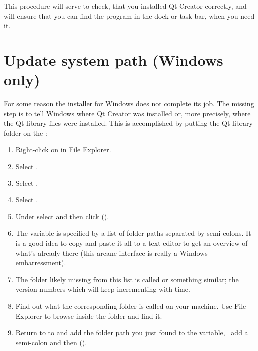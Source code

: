 This procedure will serve to check, that you installed Qt Creator correctly, and will ensure that you can find the program in the dock or task bar, when you need it.

\section{Update system path (Windows only)}
For some reason the installer for Windows does not complete its job. The missing step is to tell Windows where Qt Creator was installed or, more precisely, where the Qt library files were installed. This is accomplished by putting the Qt library folder on the :

\begin{enumerate}
\item Right-click on  in File Explorer.
\item Select .
\item Select .
\item Select .
\item Under  select  and then click  ().
\item The  variable is specified by a list of folder paths separated by semi-colons. It is a good idea to copy and paste it all to a text editor to get an overview of what's already there (this arcane interface is really a Windows embarressment).
\item The folder likely missing from this list is called  or something similar; the version numbers which will keep incrementing with time. 
\item Find out what the corresponding folder is called on your machine. Use File Explorer to browse inside the  folder and find it.
\item Return to to  and add the folder path you just found to the  variable, \eg\ add a semi-colon and then  ().
\end{enumerate}

